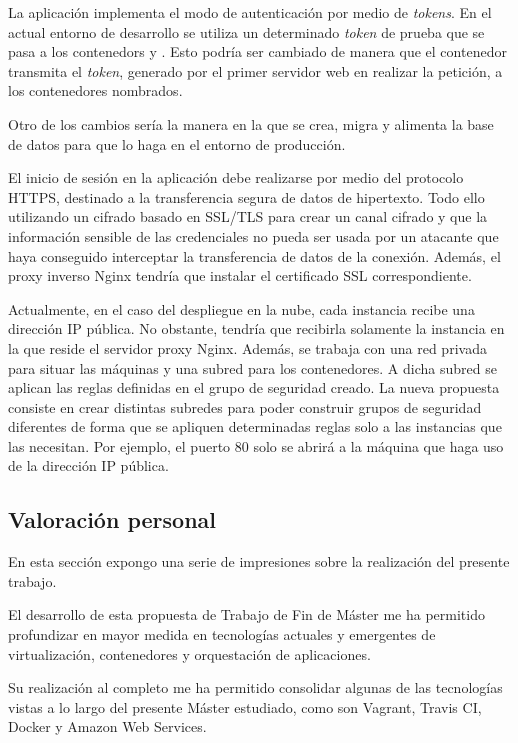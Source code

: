 La aplicación implementa el modo de autenticación por medio de \textit{tokens}. En el actual entorno de desarrollo se utiliza un determinado \textit{token} de prueba que se pasa a los contenedors  y . Esto podría ser cambiado de manera que el contenedor  transmita el \textit{token}, generado por el primer servidor web en realizar la petición, a los contenedores nombrados.

Otro de los cambios sería la manera en la que se crea, migra y alimenta la base de datos para que lo haga en el entorno de producción. 

El inicio de sesión en la aplicación debe realizarse por medio del protocolo HTTPS, destinado a la transferencia segura de datos de hipertexto. Todo ello utilizando un cifrado basado en SSL/TLS para crear un canal cifrado y que la información sensible de las credenciales no pueda ser usada por un atacante que haya conseguido interceptar la transferencia de datos de la conexión. Además, el proxy inverso Nginx tendría que instalar el certificado SSL correspondiente.

Actualmente, en el caso del despliegue en la nube, cada instancia recibe una dirección IP pública. No obstante, tendría que recibirla solamente la instancia en la que reside el servidor proxy Nginx. Además, se trabaja con una red privada para situar las máquinas y una subred para los contenedores. A dicha subred se aplican las reglas definidas en el grupo de seguridad creado. La nueva propuesta consiste en crear distintas subredes para poder construir grupos de seguridad diferentes de forma que se apliquen determinadas reglas solo a las instancias que las necesitan. Por ejemplo, el puerto 80 solo se abrirá a la máquina que haga uso de la dirección IP pública.

\subsection{Valoración personal}

En esta sección expongo una serie de impresiones sobre la realización del presente trabajo.

El desarrollo de esta propuesta de Trabajo de Fin de Máster me ha permitido profundizar en mayor medida en tecnologías actuales y emergentes de virtualización, contenedores y orquestación de aplicaciones.

Su realización al completo me ha permitido consolidar algunas de las tecnologías vistas a lo largo del presente Máster estudiado, como son Vagrant, Travis CI, Docker y Amazon Web Services.


